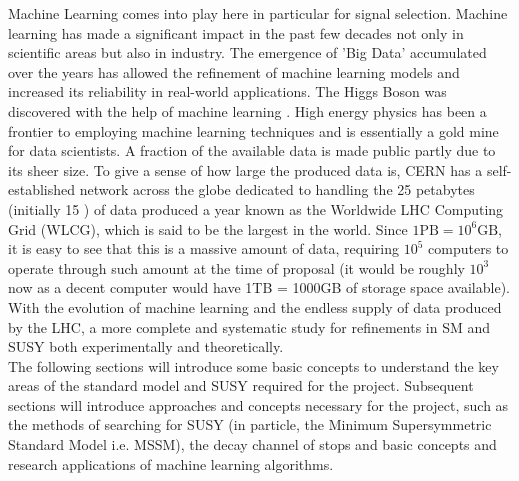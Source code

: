 Machine Learning comes into play here in particular for signal selection. Machine learning has made a significant impact in the past few decades not only in scientific areas but also in industry. The emergence of 'Big Data' accumulated over the years has allowed the refinement of machine learning models and increased its reliability in real-world applications. The Higgs Boson was discovered with the help of machine learning \cite{chatrchyan2012observation,aad2012observation}. High energy physics has been a frontier to employing machine learning techniques and is essentially a gold mine for data scientists. A fraction of the available data is made public partly due to its sheer size. To give a sense of how large the produced data is, CERN has a self-established network across the globe dedicated to handling the 25 petabytes (initially 15 \cite{shiers2007worldwide}) of data produced a year known as the Worldwide LHC Computing Grid (WLCG), which is said to be the largest in the world. Since $1\text{PB} = 10^6\text{GB}$, it is easy to see that this is a massive amount of data, requiring $10^5$ computers to operate through such amount at the time of proposal \cite{shiers2007worldwide} (it would be roughly $10^3$ now as a decent computer would have 1TB = 1000GB of storage space available). With the evolution of machine learning and the endless supply of data produced by the LHC, a more complete and systematic study for refinements in SM and SUSY both experimentally and theoretically.\\

The following sections will introduce some basic concepts to understand the key areas of the standard model and SUSY required for the project. Subsequent sections will introduce approaches and concepts necessary for the project, such as the methods of searching for SUSY (in particle, the Minimum Supersymmetric Standard Model i.e. MSSM), the decay channel of stops and basic concepts and research applications of machine learning algorithms.